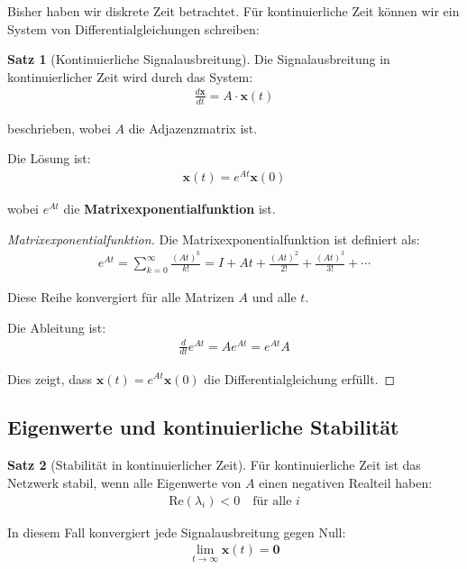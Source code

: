 ﻿\documentclass[a4paper,12pt]{report}
\theoremstyle{definition}
\newtheorem{satz}{Satz}
\begin{document}
	Bisher haben wir diskrete Zeit betrachtet. Für kontinuierliche Zeit können wir ein System von Differentialgleichungen schreiben:
	
	\begin{satz}[Kontinuierliche Signalausbreitung]
		Die Signalausbreitung in kontinuierlicher Zeit wird durch das System:
		\begin{align}
			\frac{d\mathbf{x}}{dt} = A \cdot \mathbf{x}(t)
		\end{align}
		
		beschrieben, wobei $A$ die Adjazenzmatrix ist.
		
		Die Lösung ist:
		\begin{align}
			\mathbf{x}(t) = e^{At} \mathbf{x}(0)
		\end{align}
		
		wobei $e^{At}$ die \textbf{Matrixexponentialfunktion} ist.
	\end{satz}
	
	\begin{proof}[Matrixexponentialfunktion]
		Die Matrixexponentialfunktion ist definiert als:
		\begin{align}
			e^{At} = \sum_{k=0}^{\infty} \frac{(At)^k}{k!} = I + At + \frac{(At)^2}{2!} + \frac{(At)^3}{3!} + \cdots
		\end{align}
		
		Diese Reihe konvergiert für alle Matrizen $A$ und alle $t$.
		
		Die Ableitung ist:
		\begin{align}
			\frac{d}{dt} e^{At} = A e^{At} = e^{At} A
		\end{align}
		
		Dies zeigt, dass $\mathbf{x}(t) = e^{At} \mathbf{x}(0)$ die Differentialgleichung erfüllt.
	\end{proof}
	
	\subsection{Eigenwerte und kontinuierliche Stabilität}
	
	\begin{satz}[Stabilität in kontinuierlicher Zeit]
		Für kontinuierliche Zeit ist das Netzwerk stabil, wenn alle Eigenwerte von $A$ einen negativen Realteil haben:
		\begin{align}
			\text{Re}(\lambda_i) < 0 \quad \text{für alle } i
		\end{align}
		
		In diesem Fall konvergiert jede Signalausbreitung gegen Null:
		\begin{align}
			\lim_{t \to \infty} \mathbf{x}(t) = \mathbf{0}
		\end{align}
	\end{satz}
	
\end{document}
